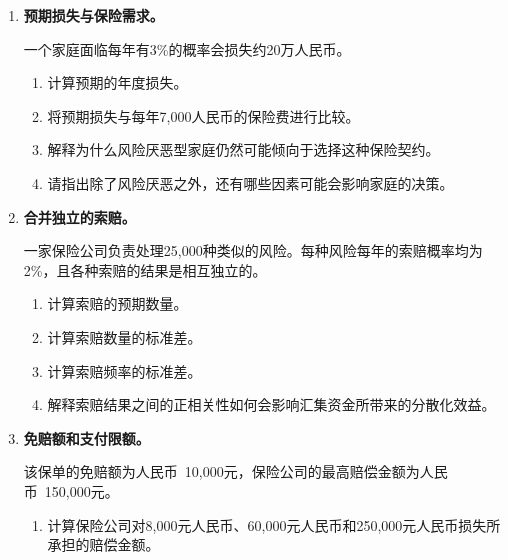 


\begin{enumerate}

\item \textbf{预期损失与保险需求。}

一个家庭面临每年有3\%的概率会损失约20万人民币。

\begin{enumerate}

\item 计算预期的年度损失。

\item 将预期损失与每年7,000人民币的保险费进行比较。

\item 解释为什么风险厌恶型家庭仍然可能倾向于选择这种保险契约。

\item 请指出除了风险厌恶之外，还有哪些因素可能会影响家庭的决策。

\end{enumerate}

\item \textbf{合并独立的索赔。}

一家保险公司负责处理25,000种类似的风险。每种风险每年的索赔概率均为2\%，且各种索赔的结果是相互独立的。

\begin{enumerate}

\item 计算索赔的预期数量。

\item 计算索赔数量的标准差。

\item 计算索赔频率的标准差。

\item 解释索赔结果之间的正相关性如何会影响汇集资金所带来的分散化效益。

\end{enumerate}

\item \textbf{免赔额和支付限额。}

该保单的免赔额为人民币~10,000元，保险公司的最高赔偿金额为人民币~150,000元。

\begin{enumerate}

\item 计算保险公司对8,000元人民币、60,000元人民币和250,000元人民币损失所承担的赔偿金额。


\end{enumerate}
\end{enumerate}
